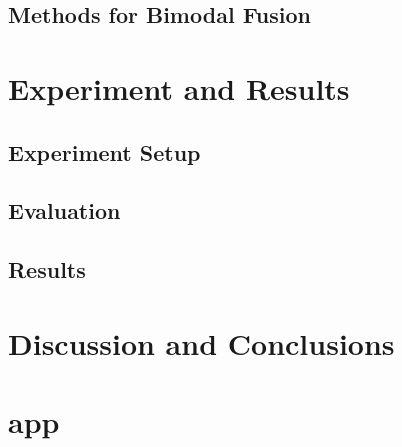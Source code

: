 \documentclass[12pt,final,twoside]{report}
\theoremstyle{plain}
\theoremstyle{definition}
\theoremstyle{remark}
\begin{document}
\section{Methods for Bimodal Fusion}

\cleardoublepage
\chapter{Experiment and Results}
\section{Experiment Setup}

\section{Evaluation}
\section{Results}

\cleardoublepage
\chapter{Discussion and Conclusions}

\cleardoublepage
\appendix
\fancyhead[LO,RE]{}                      %

\chapter{app}

\cleardoublepage



\cleardoublepage
\end{document}
